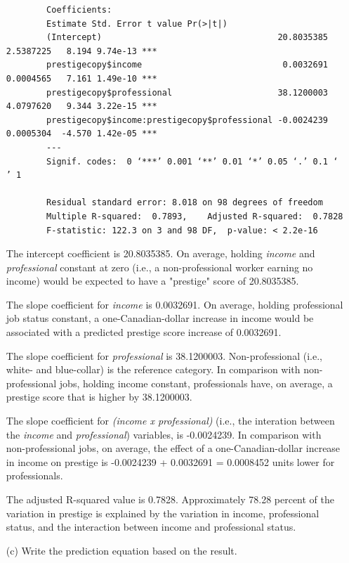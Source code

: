 \documentclass[12pt,letterpaper]{article}
\begin{document}
\begin{enumerate}
\begin{verbatim}
		Coefficients:
		Estimate Std. Error t value Pr(>|t|)    
		(Intercept)                                   20.8035385  2.5387225   8.194 9.74e-13 ***
		prestigecopy$income                            0.0032691  0.0004565   7.161 1.49e-10 ***
		prestigecopy$professional                     38.1200003  4.0797620   9.344 3.22e-15 ***
		prestigecopy$income:prestigecopy$professional -0.0024239  0.0005304  -4.570 1.42e-05 ***
		---
		Signif. codes:  0 ‘***’ 0.001 ‘**’ 0.01 ‘*’ 0.05 ‘.’ 0.1 ‘ ’ 1
		
		Residual standard error: 8.018 on 98 degrees of freedom
		Multiple R-squared:  0.7893,	Adjusted R-squared:  0.7828 
		F-statistic: 122.3 on 3 and 98 DF,  p-value: < 2.2e-16  
	\end{verbatim}
	
	The intercept coefficient is 20.8035385. On average, holding \textit{income} and \textit{professional} constant at zero (i.e., a non-professional worker earning no income) would be expected to have a "prestige" score of 20.8035385. 
	
	The slope coefficient for \textit{income} is 0.0032691. On average, holding professional job status constant, a one-Canadian-dollar increase in income would be associated with a predicted prestige score increase of 0.0032691. 
	
	The slope coefficient for \textit{professional} is 38.1200003. Non-professional (i.e., white- and blue-collar) is the reference category. In comparison with non-professional jobs, holding income constant, professionals have, on average, a prestige score that is higher by 38.1200003. 
	
	The slope coefficient for \textit{(income x professional)} (i.e., the interation between the \textit{income} and \textit{professional}) variables, is -0.0024239. In comparison with non-professional jobs, on average, the effect of a one-Canadian-dollar increase in income on prestige is -0.0024239 + 0.0032691 = 0.0008452 units lower for professionals. 
	
	The adjusted R-squared value is 0.7828. Approximately 78.28 percent of the variation in prestige is explained by the variation in income, professional status, and the interaction between income and professional status. 
	
	\vspace{6cm}
	\item [(c)]
	Write the prediction equation based on the result. \vspace{.5cm}
	

\end{enumerate}
\end{document}
